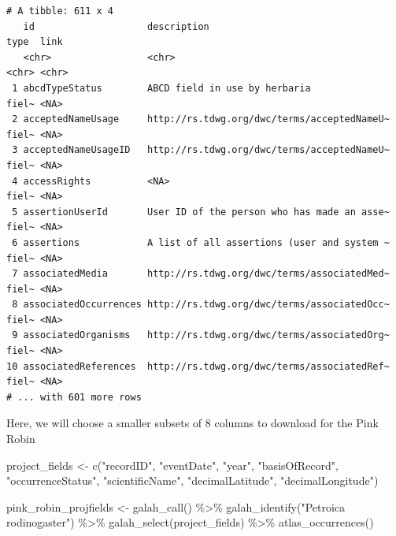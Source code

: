 \documentclass[
  letterpaper,
  DIV=11,
  numbers=noendperiod,
  oneside]{scrreprt}
\newenvironment{Shaded}{\begin{snugshade}}{\end{snugshade}}
\newcommand{\FunctionTok}[1]{\textcolor[rgb]{0.28,0.35,0.67}{#1}}
\newcommand{\NormalTok}[1]{\textcolor[rgb]{0.00,0.23,0.31}{#1}}
\newcommand{\OtherTok}[1]{\textcolor[rgb]{0.00,0.23,0.31}{#1}}
\newcommand{\SpecialCharTok}[1]{\textcolor[rgb]{0.37,0.37,0.37}{#1}}
\newcommand{\StringTok}[1]{\textcolor[rgb]{0.13,0.47,0.30}{#1}}
\begin{document}
\begin{verbatim}
# A tibble: 611 x 4
   id                    description                                 type  link 
   <chr>                 <chr>                                       <chr> <chr>
 1 abcdTypeStatus        ABCD field in use by herbaria               fiel~ <NA> 
 2 acceptedNameUsage     http://rs.tdwg.org/dwc/terms/acceptedNameU~ fiel~ <NA> 
 3 acceptedNameUsageID   http://rs.tdwg.org/dwc/terms/acceptedNameU~ fiel~ <NA> 
 4 accessRights          <NA>                                        fiel~ <NA> 
 5 assertionUserId       User ID of the person who has made an asse~ fiel~ <NA> 
 6 assertions            A list of all assertions (user and system ~ fiel~ <NA> 
 7 associatedMedia       http://rs.tdwg.org/dwc/terms/associatedMed~ fiel~ <NA> 
 8 associatedOccurrences http://rs.tdwg.org/dwc/terms/associatedOcc~ fiel~ <NA> 
 9 associatedOrganisms   http://rs.tdwg.org/dwc/terms/associatedOrg~ fiel~ <NA> 
10 associatedReferences  http://rs.tdwg.org/dwc/terms/associatedRef~ fiel~ <NA> 
# ... with 601 more rows
\end{verbatim}

Here, we will choose a smaller subsets of 8 columns to download for the
Pink Robin

\begin{Shaded}
\begin{Highlighting}[]
\NormalTok{project\_fields }\OtherTok{\textless{}{-}} \FunctionTok{c}\NormalTok{(}\StringTok{"recordID"}\NormalTok{,}
                    \StringTok{"eventDate"}\NormalTok{,}
                    \StringTok{"year"}\NormalTok{, }
                    \StringTok{"basisOfRecord"}\NormalTok{, }
                    \StringTok{"occurrenceStatus"}\NormalTok{,}
                    \StringTok{"scientificName"}\NormalTok{,}
                    \StringTok{"decimalLatitude"}\NormalTok{,}
                    \StringTok{"decimalLongitude"}\NormalTok{)}

\NormalTok{pink\_robin\_projfields }\OtherTok{\textless{}{-}} \FunctionTok{galah\_call}\NormalTok{() }\SpecialCharTok{\%\textgreater{}\%} 
  \FunctionTok{galah\_identify}\NormalTok{(}\StringTok{"Petroica rodinogaster"}\NormalTok{) }\SpecialCharTok{\%\textgreater{}\%} 
  \FunctionTok{galah\_select}\NormalTok{(project\_fields) }\SpecialCharTok{\%\textgreater{}\%} 
  \FunctionTok{atlas\_occurrences}\NormalTok{()}
\end{Highlighting}
\end{Shaded}
\end{document}
